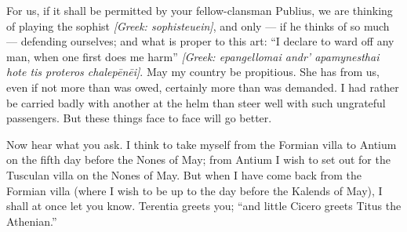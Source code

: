  For us, if it shall be permitted by your fellow-clansman Publius, we are thinking of playing the sophist \textit{[Greek: sophisteuein]}, and only --- if he thinks of so much --- defending ourselves; and what is proper to this art: ``I declare to ward off any man, when one first does me harm'' \textit{[Greek: epangellomai andr' apamynesthai hote tis proteros chalep\=en\=ei]}. May my country be propitious. She has from us, even if not more than was owed, certainly more than was demanded. I had rather be carried badly with another at the helm than steer well with such ungrateful passengers. But these things face to face will go better.

 Now hear what you ask. I think to take myself from the Formian villa to Antium on the fifth day before the Nones of May; from Antium I wish to set out for the Tusculan villa on the Nones of May. But when I have come back from the Formian villa (where I wish to be up to the day before the Kalends of May), I shall at once let you know. Terentia greets you; ``and little Cicero greets Titus the Athenian.''
